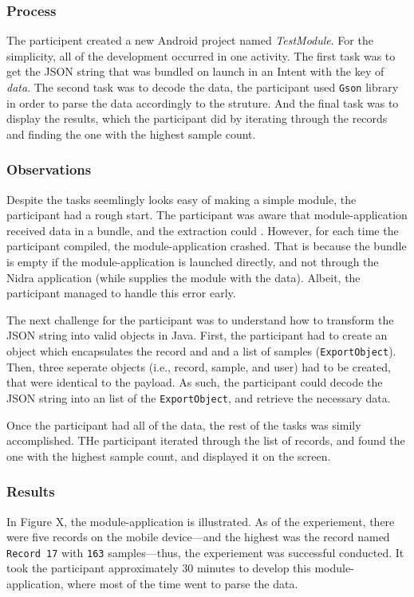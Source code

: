 \subsubsection{Process}

The participent created a new Android project named \textit{TestModule}. For the simplicity, all of the development occurred in one activity. The first task was to get the JSON string that was bundled on launch in an Intent with the key of \textit{data}. The second task was to decode the data, the participant used  \verb|Gson| library in order to parse the data accordingly to the struture. And the final task was to display the results, which the participant did by iterating through the records and finding the one with the highest sample count.

\subsubsection{Observations}
Despite the tasks seemlingly looks easy of making a simple module, the participant had a rough start. The participant was aware that module-application received data in a bundle, and the extraction could . However, for each time the participant compiled, the module-application crashed. That is because the bundle is empty if the module-application is launched directly, and not through the Nidra application (while supplies the module with the data). Albeit, the participant managed to handle this error early. 

The next challenge for the participant was to understand how to transform the JSON string into valid objects in Java. First, the participant had to create an object which encapsulates the record and and a list of samples (\verb|ExportObject|). Then, three seperate objects (i.e., record, sample, and user) had to be created, that were identical to the payload. As such, the participant could decode the JSON string into an list of the \verb|ExportObject|, and retrieve the necessary data.

Once the participant had all of the data, the rest of the tasks was simily accomplished. THe participant iterated through the list of records, and found the one with the highest sample count, and displayed it on the screen. 

\subsubsection{Results}

In Figure X, the module-application is illustrated. As of the experiement, there were five records on the mobile device---and the highest was the record named \verb|Record 17| with \verb|163| samples---thus, the experiement was successful conducted. It took the participant approximately 30 minutes to develop this module-application, where most of the time went to parse the data.

